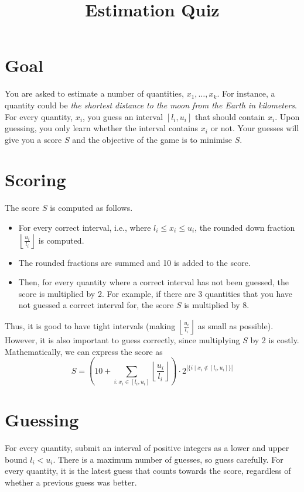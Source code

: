 \documentclass{article}
\title{\Huge Estimation Quiz}
\date{}
\begin{document}
	\maketitle
	\thispagestyle{empty}
	\section*{Goal}
		You are asked to estimate a number of quantities, $x_1, \dots, x_k$. For instance, a quantity could be \emph{the shortest distance to the moon from the Earth in kilometers}. For every quantity, $x_i$, you guess an interval $[l_i, u_i]$ that should contain $x_i$. Upon guessing, you only learn whether the interval contains $x_i$ or not. Your guesses will give you a score $S$ and the objective of the game is to minimise $S$.
		
	\section*{Scoring}
		The score $S$ is computed as follows.
		\begin{itemize}
			\item For every correct interval, i.e., where $l_i\leq x_i\leq u_i$, the rounded down fraction $\left\lfloor \frac{u_i}{l_i	}\right\rfloor$ is computed.
			\item The rounded fractions are summed and 10 is added to the score.
			\item Then, for every quantity where a correct interval has not been guessed, the score is multiplied by 2. For example, if there are 3 quantities that you have not guessed a correct interval for, the score $S$ is multiplied by 8.
		\end{itemize}
		Thus, it is good to have tight intervals (making $\left\lfloor \frac{u_i}{l_i	}\right\rfloor$ as small as possible). However, it is also important to guess correctly, since multiplying $S$ by 2 is costly. Mathematically, we can express the score as
		$$
		S = \left( 10 + \sum_{i: x_i\in [l_i, u_i]} \left\lfloor \frac{u_i}{l_i	}\right\rfloor \right)\cdot 2^{\left | \{ i \mid x_i\not\in [l_i, u_i] \} \right|}
		$$
	\section*{Guessing}
	For every quantity, submit an interval of positive integers as a lower and upper bound $l_i < u_i$. There is a maximum number of guesses, so guess carefully. For every quantity, it is the latest guess that counts towards the score, regardless of whether a previous guess was better.

	
\end{document}
